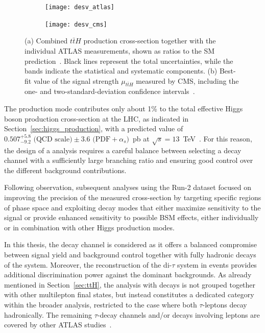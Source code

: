 \begin{figure}[htbp]
  \centering
  \begin{subfigure}[b]{0.6\textwidth}
    \centering
    \texttt{[image: desv\_atlas]}
    \caption{}
    \label{fig:tth_obs_atlas}
  \end{subfigure}%
  \hfill
  \begin{subfigure}[b]{0.4\textwidth}
    \centering
    \texttt{[image: desv\_cms]}
    \caption{}
    \label{fig:tth_obs_cms}
  \end{subfigure}
  
  \caption{(a) Combined $t\bar{t}H$ production cross-section together with the individual ATLAS measurements, shown as ratios to the SM prediction~\cite{ATLAS:2018mme}. Black lines represent the total uncertainties, while the bands indicate the statistical and systematic components. (b) Best-fit value of the signal strength $\mu_{t\bar{t}H}$ measured by CMS, including the one- and two-standard-deviation confidence intervals~\cite{CMS:2018uxb}.}
  \label{fig:tth_obs}
\end{figure}


  The \ttH production mode contributes only about 1\% to the total effective Higgs boson production cross-section at the LHC, as indicated in Section~\ref{sec:higgs_production}, with a predicted value of $0.507^{+5.8}_{-9.2} \text{ (QCD scale)} \pm 3.6 \text{ (PDF}+\alpha_{s})$~pb at $\sqrt{s}=13$~TeV~\cite{https://doi.org/10.23731/cyrm-2017-002}. For this reason, the design of a \ttH analysis requires a careful balance between selecting a decay channel with a sufficiently large branching ratio and ensuring good control over the different background contributions.  

  Following \ttH observation, subsequent analyses using the Run-2 dataset focused on improving the precision of the measured cross-section by targeting specific regions of phase space and exploiting decay modes that either maximize sensitivity to the signal or provide enhanced sensitivity to possible BSM effects, either individually or in combination with other Higgs production modes. %
  
  In this thesis, the \htautau decay channel is considered as it offers a balanced compromise between signal yield and background control together with fully hadronic decays of the \ttbar system. Moreover, the reconstruction of the di-$\tau$ system in \htautau events provides additional discrimination power against the dominant backgrounds. As already mentioned in Section~\ref{sec:ttH}, the \ttH analysis with \htautau decays is not grouped together with other multilepton final states, but instead constitutes a dedicated category within the broader \htautau analysis, restricted to the case where both $\tau$-leptons decay hadronically. The remaining $\tau$-decay channels and/or \ttbar decays involving leptons are covered by other ATLAS studies~\cite{PhysRevD.97.072003}.  
  
